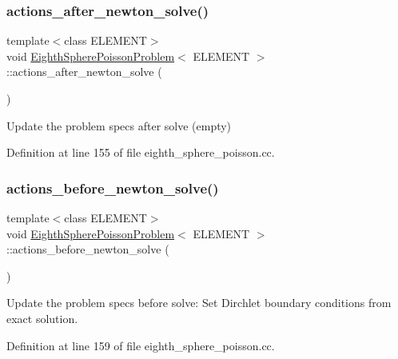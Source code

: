 \subsubsection{\texorpdfstring{actions\+\_\+after\+\_\+newton\+\_\+solve()}{actions\_after\_newton\_solve()}}
{\footnotesize\ttfamily template$<$class E\+L\+E\+M\+E\+NT$>$ \\
void \hyperlink{classEighthSpherePoissonProblem}{Eighth\+Sphere\+Poisson\+Problem}$<$ E\+L\+E\+M\+E\+NT $>$\+::actions\+\_\+after\+\_\+newton\+\_\+solve (\begin{DoxyParamCaption}{ }\end{DoxyParamCaption})\hspace{0.3cm}{\ttfamily [inline]}}



Update the problem specs after solve (empty) 



Definition at line 155 of file eighth\+\_\+sphere\+\_\+poisson.\+cc.

\mbox{\label{classEighthSpherePoissonProblem_af82dd7abdf631950a68c997af314be5d}} 
\subsubsection{\texorpdfstring{actions\+\_\+before\+\_\+newton\+\_\+solve()}{actions\_before\_newton\_solve()}}
{\footnotesize\ttfamily template$<$class E\+L\+E\+M\+E\+NT$>$ \\
void \hyperlink{classEighthSpherePoissonProblem}{Eighth\+Sphere\+Poisson\+Problem}$<$ E\+L\+E\+M\+E\+NT $>$\+::actions\+\_\+before\+\_\+newton\+\_\+solve (\begin{DoxyParamCaption}{ }\end{DoxyParamCaption})\hspace{0.3cm}{\ttfamily [inline]}}



Update the problem specs before solve\+: Set Dirchlet boundary conditions from exact solution. 



Definition at line 159 of file eighth\+\_\+sphere\+\_\+poisson.\+cc.




